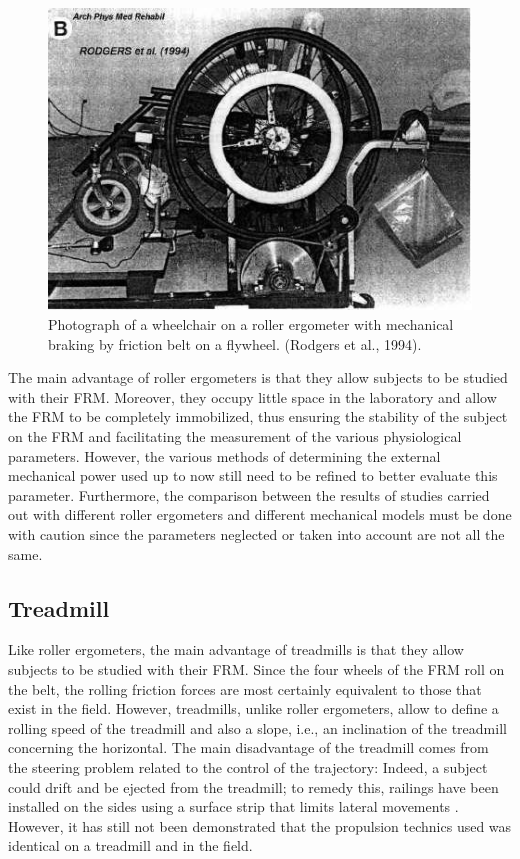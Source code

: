 \begin{figure}[h]
\center
\includegraphics[scale = 25]{images/FRER}
\caption{Photograph of a wheelchair on a roller ergometer with mechanical braking by friction belt on a flywheel. (Rodgers et al., 1994).}
\label{FRER}
\end{figure}

The main advantage of roller ergometers is that they allow subjects to be studied with their FRM. Moreover, they occupy little space in the laboratory and allow the FRM to be completely immobilized, thus ensuring the stability of the subject on the FRM and facilitating the measurement of the various physiological parameters. However, the various methods of determining the external mechanical power used up to now still need to be refined to better evaluate this parameter. Furthermore, the comparison between the results of studies carried out with different roller ergometers and different mechanical models must be done with caution since the parameters neglected or taken into account are not all the same.

\subsection{Treadmill}
Like roller ergometers, the main advantage of treadmills is that they allow subjects to be studied with their FRM. Since the four wheels of the FRM roll on the belt, the rolling friction forces are most certainly equivalent to those that exist in the field. However, treadmills, unlike roller ergometers, allow to define a rolling speed of the treadmill and also a slope, i.e., an inclination of the treadmill concerning the horizontal. The main disadvantage of the treadmill comes from the steering problem related to the control of the trajectory: Indeed, a subject could drift and be ejected from the treadmill; to remedy this, railings have been installed on the sides using a surface strip that limits lateral movements \cite{claremont1985model}. However, it has still not been demonstrated that the propulsion technics used was identical on a treadmill and in the field.

